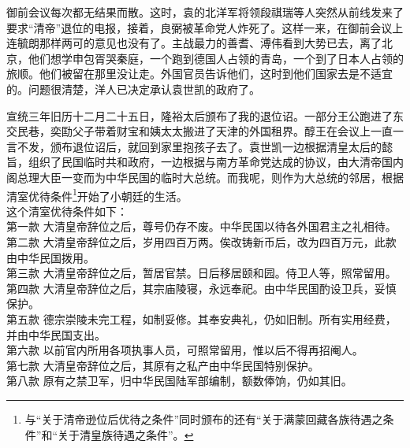 御前会议每次都无结果而散。这时，袁的北洋军将领段祺瑞等人突然从前线发来了要求“清帝”退位的电报，接着，良弼被革命党人炸死了。这样一来，在御前会议上连毓朗那样两可的意见也没有了。主战最力的善耆、溥伟看到大势已去，离了北京，他们想学申包胥哭秦庭，一个跑到德国人占领的青岛，一个到了日本人占领的旅顺。他们被留在那里没让走。外国官员告诉他们，这时到他们国家去是不适宜的。问题很清楚，洋人已决定承认袁世凯的政府了。

宣统三年旧历十二月二十五日，隆裕太后颁布了我的退位诏。一部分王公跑进了东交民巷，奕劻父子带着财宝和姨太太搬进了天津的外国租界。醇王在会议上一直一言不发，颁布退位诏后，就回到家里抱孩子去了。袁世凯一边根据清皇太后的懿旨，组织了民国临时共和政府，一边根据与南方革命党达成的协议，由大清帝国内阁总理大臣一变而为中华民国的临时大总统。而我呢，则作为大总统的邻居，根据清室优待条件\footnote{与“关于清帝逊位后优待之条件”同时颁布的还有“关于满蒙回藏各族待遇之条件”和“关于清皇族待遇之条件”。}开始了小朝廷的生活。\\

这个清室优待条件如下：\\

第一款  大清皇帝辞位之后，尊号仍存不废。中华民国以待各外国君主之礼相待。\\

第二款  大清皇帝辞位之后，岁用四百万两。俟改铸新币后，改为四百万元，此款由中华民国拨用。\\

第三款  大清皇帝辞位之后，暂居官禁。日后移居颐和园。侍卫人等，照常留用。\\

第四款  大清皇帝辞位之后，其宗庙陵寝，永远奉祀。由中华民国酌设卫兵，妥慎保护。\\

第五款  德宗崇陵未完工程，如制妥修。其奉安典礼，仍如旧制。所有实用经费，并由中华民国支出。\\

第六款  以前官内所用各项执事人员，可照常留用，惟以后不得再招阉人。\\

第七款  大清皇帝辞位之后，其原有之私产由中华民国特别保护。\\

第八款  原有之禁卫军，归中华民国陆军部编制，额数俸饷，仍如其旧。\\
